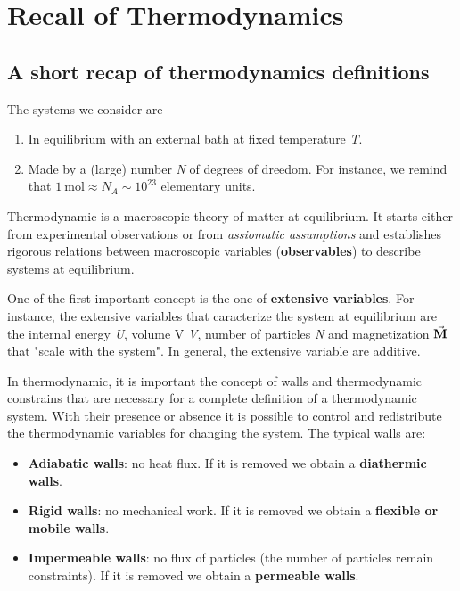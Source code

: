 \documentclass[../main/main.tex]{subfiles}
\begin{document}
\chapter{Recall of Thermodynamics}


\section{A short recap of thermodynamics definitions}

\noindent The systems we consider are

\begin{enumerate}
\item In equilibrium with an external bath at fixed temperature \emph{T}.
\item Made by a (large) number \emph{N} of degrees of dreedom. For instance, we remind that \( \SI{1}{\mole} \approx N_A \sim 10^{23}\) elementary units.
\end{enumerate}

\noindent Thermodynamic is a macroscopic theory of matter at equilibrium.
It starts either from experimental observations or from \emph{assiomatic assumptions} and establishes rigorous relations between macroscopic variables (\textbf{observables}) to describe systems at equilibrium.

One of the first important concept is the one of \textbf{extensive variables}. For instance, the extensive variables that caracterize the system at equilibrium are the internal energy \emph{U}, volume V \emph{V}, number of particles \emph{N} and magnetization \( \va{M} \) that "scale with the system".
In general, the extensive variable are additive.

In thermodynamic, it is important the concept of walls and thermodynamic constrains that are necessary for a complete definition of a thermodynamic system. With their presence or absence it is possible to control and redistribute the thermodynamic variables for changing the system.
The typical walls are:
\begin{itemize}
\item \textbf{Adiabatic walls}: no heat flux. If it is removed we obtain a \textbf{diathermic walls}.
\item \textbf{Rigid walls}: no mechanical work. If it is removed we obtain a \textbf{flexible or mobile walls}.
\item \textbf{Impermeable walls}: no flux of particles (the number of particles remain constraints). If it is removed we obtain a \textbf{permeable walls}.
\end{itemize}
\end{document}
